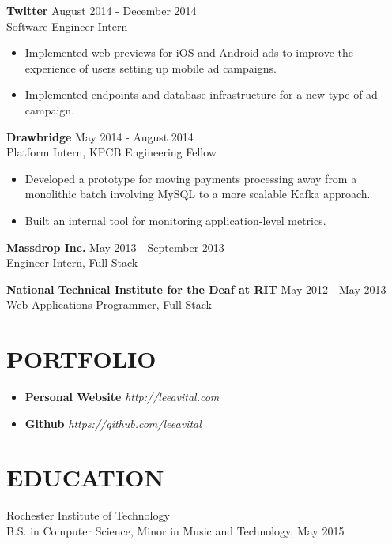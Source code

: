 \documentclass[line,margin]{res}
\begin{document}
\begin{resume}
{\bf Twitter} \hfill August 2014 - December 2014 \\
Software Engineer Intern
\begin{itemize}
\item Implemented web previews for iOS and Android ads to improve the experience of users setting up mobile ad campaigns.
\item Implemented endpoints and database infrastructure for a new type of ad campaign.
\end{itemize}

{\bf Drawbridge} \hfill May 2014 - August 2014 \\
Platform Intern, KPCB Engineering Fellow
\begin{itemize}
\item Developed a prototype for moving payments processing away from a monolithic batch involving MySQL to a more scalable Kafka approach.
\item Built an internal tool for monitoring application-level metrics.
\end{itemize}

{\bf Massdrop Inc.} \hfill May 2013 - September 2013\\
Engineer Intern, Full Stack

{\bf  National Technical Institute for the Deaf at RIT} \hfill May 2012 - May 2013\\
Web Applications Programmer, Full Stack

\section{PORTFOLIO}

\begin{itemize}
\item {\bf Personal Website}  {\sl http://leeavital.com}
\item {\bf Github} {\sl  https://github.com/leeavital }
\end{itemize}


\section{EDUCATION}   Rochester Institute of Technology \\
                      B.S. in  Computer Science,  Minor in Music and Technology, May 2015 \\

\end{resume}
\end{document}
